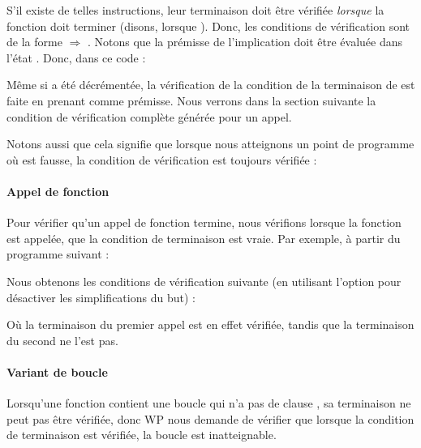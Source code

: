 

S'il existe de telles instructions, leur terminaison doit être vérifiée
\textit{lorsque} la fonction doit terminer (disons, lorsque ). Donc,
les conditions de vérification sont de la forme
 $\Rightarrow$ .
Notons que la prémisse de l'implication doit être évaluée dans l'état
. Donc, dans ce code :




Même si  a été décrémentée, la vérification de la condition de
la terminaison de  est faite en prenant
 comme prémisse. Nous verrons dans
la section suivante la condition de vérification complète générée pour un appel.


Notons aussi que cela signifie que lorsque nous atteignons un point de programme
où  est fausse, la condition de vérification est toujours
vérifiée :




\paragraph{Appel de fonction}


Pour vérifier qu'un appel de fonction termine, nous vérifions lorsque la
fonction est appelée, que la condition de terminaison est vraie. Par exemple, à
partir du programme suivant :




Nous obtenons les conditions de vérification suivante (en utilisant l'option
 pour désactiver les simplifications du but) :






Où la terminaison du premier appel est en effet vérifiée, tandis que la
terminaison du second ne l'est pas.


\paragraph{Variant de boucle}


Lorsqu'une fonction contient une boucle qui n'a pas de clause
, sa terminaison ne peut pas être vérifiée, donc WP
nous demande de vérifier que lorsque la condition de terminaison est vérifiée,
la boucle est inatteignable.


